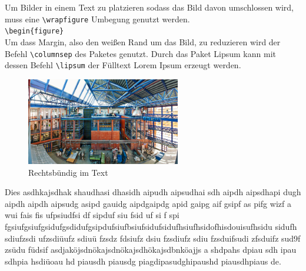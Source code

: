 Um Bilder in einem Text zu platzieren sodass das Bild davon umschlossen wird, muss eine \verb|\wrapfigure| Umbegung genutzt werden.\\

\verb|\begin{figure}|\\
Um dass Margin, also den weißen Rand um das Bild, zu reduzieren wird der Befehl \verb|\columnsep| des Paketes genutzt. Durch das Paket Lipsum kann mit dessen Befehl \verb|\lipsum| der Fülltext Lorem Ipsum erzeugt werden.\\

\lipsum[1-1]
\begingroup
\setlength{\columnsep}{-30pt} %
\setlength{\intextsep}{1pt}  %
\begin{figure}
	\begin{center}
		\includegraphics[width=0.6\textwidth]{images/Haus_Z.jpeg}
	\end{center}
	\caption{Rechtsbündig im Text \autocite{hauszpic}}\label{fig:classrr}
\end{figure}
Dies asdhkajsdhak shaudhasi dhasidh aipudh aipsudhai sdh aipdh aipsdhapi dugh aipdh aipdh aipsudg asipd gauidg aipdgaipdg apid gaipg aif gsipf as pifg wizf a wui fais fis ufpsiudfsi df sipduf siu fsid uf si f spi fgsiufgsiufgsidufgsdidufgsipdufsiufbsiufsidufsidufhsiufhsidofhisdouisufhsidu  sidufh sdiufzsdi ufzsdiüufz sdiuü fzsdz fdsiufz dsiu fzsdiufz sdiu fzsduifsudi zfsduifz sud9f zsüdu füdsif asdjaköjsdnökajsdnökajsdhökajsdbnköajjs a shdpahs dpiau sdh ipau sdhpia hsdiüoau hd piausdh piausdg piagdipasudghipaushd piausdhpiaus de.
\par
\endgroup




